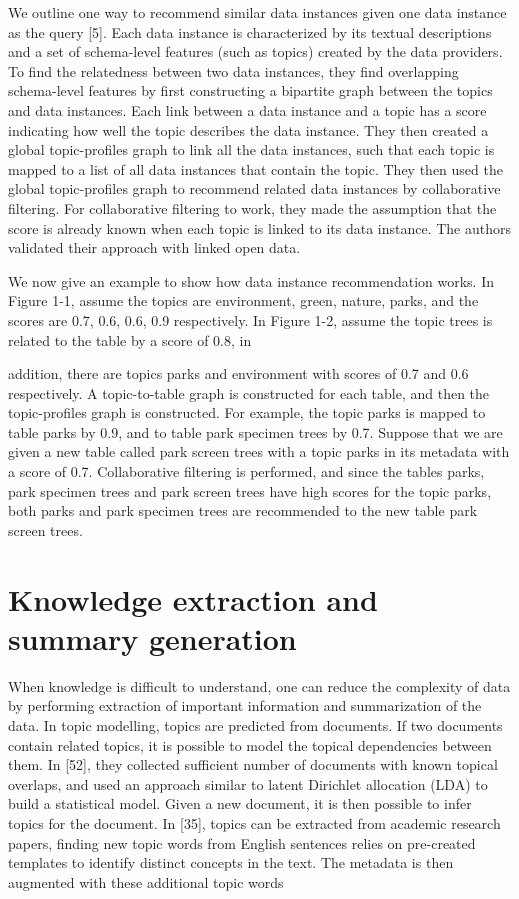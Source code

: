 We outline one way to recommend similar data instances given one data instance as the query [5]. Each data instance is characterized by its textual descriptions and a set of schema-level features (such as topics) created by the data providers. To find the relatedness between two data instances, they find overlapping schema-level features by first constructing a bipartite graph between the topics and data instances. Each link between a data instance and a topic has a score indicating how well the topic describes the data instance. They then created a global topic-profiles graph to link all the data instances, such that each topic is mapped to a list of all data instances that contain the topic. They then used the global topic-profiles graph to recommend related data instances by collaborative filtering. For collaborative filtering to work, they made the assumption that the score is already known when each topic is linked to its data instance. The authors validated their approach with linked open data.

We now give an example to show how data instance recommendation works. In Figure 1-1, assume the topics are environment, green, nature, parks, and the scores are 0.7, 0.6, 0.6, 0.9 respectively. In Figure 1-2, assume the topic trees is related to the table by a score of 0.8, in

addition, there are topics parks and environment with scores of 0.7 and 0.6 respectively. A topic-to-table graph is constructed for each table, and then the topic-profiles graph is constructed. For example, the topic parks is mapped to table parks by 0.9, and to table park specimen trees by 0.7. Suppose that we are given a new table called park screen trees with a topic parks in its metadata with a score of 0.7. Collaborative filtering is performed, and since the tables parks, park specimen trees and park screen trees have high scores for the topic parks, both parks and park specimen trees are recommended to the new table park screen trees.

\section{Knowledge extraction and summary generation}
\label{sec:KnowledgeExtractionAndSummaryGeneration}

When knowledge is difficult to understand, one can reduce the complexity of data by performing extraction of important information and summarization of the data. In topic modelling, topics are predicted from documents. If two documents contain related topics, it is possible to model the topical dependencies between them. In [52], they collected sufficient number of documents with known topical overlaps, and used an approach similar to latent Dirichlet allocation (LDA) to build a statistical model. Given a new document, it is then possible to infer topics for the document. In [35], topics can be extracted from academic research papers, finding new topic words from English sentences relies on pre-created templates to identify distinct concepts in the text. The metadata is then augmented with these additional topic words

